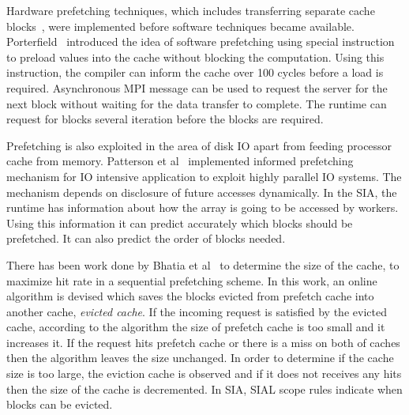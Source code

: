 Hardware prefetching techniques, which includes transferring separate
cache blocks~\cite{Smith1978}, were implemented before software techniques became
available. Porterfield~\cite{Porterfield1989} introduced the idea of software prefetching
using special instruction to preload values into the cache without blocking the
computation. Using this instruction, the compiler can inform the cache over 100
cycles before a load is required. Asynchronous MPI message can be used to request
the server for the next block without waiting for the data transfer to complete. The runtime can
request for blocks several iteration before the blocks are required.

Prefetching is also exploited in the area of disk IO apart from feeding processor cache
from memory. Patterson et al~\cite{Patterson1994} implemented informed prefetching
mechanism for IO intensive application to exploit highly parallel IO systems. The
mechanism depends on disclosure of future accesses dynamically. In the SIA, the runtime
has information about how the array is going to be accessed by workers. Using this
information it can predict accurately which blocks should be prefetched. It can
also predict the order of blocks needed.


There has been work done by Bhatia et al~\cite{Bhatia2010} to determine the size of
the cache, to maximize hit rate in a sequential prefetching scheme. In this work, an
online algorithm is devised which saves the blocks evicted from prefetch cache
into another cache, \textit{evicted cache}. If the incoming request is satisfied
by the evicted cache, according to the algorithm the size of prefetch cache is too
small and it increases it. If the request hits prefetch cache or there is a miss
on both of caches then the algorithm leaves the size unchanged. In order to determine if
the cache size is too large, the eviction cache is observed and if it does not
receives any hits then the size of the cache is decremented. In SIA, SIAL scope rules
indicate when blocks can be evicted.

